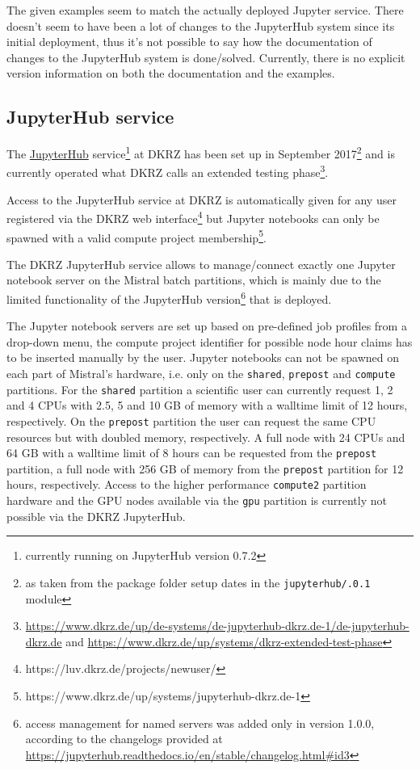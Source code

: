 The given examples seem to match the actually deployed Jupyter service.
There doesn't seem to have been a lot of changes to the JupyterHub system since its initial deployment, thus it's not possible to say how the documentation of changes to the JupyterHub system is done/solved.
Currently, there is no explicit version information on both the documentation and the examples.

\subsection{JupyterHub service}

The \href{https://jupyterhub.dkrz.de/}{JupyterHub} service\footnote{currently running on JupyterHub version 0.7.2} at DKRZ has been set up in September 2017\footnote{as taken from the package folder setup dates in the {\tt jupyterhub/.0.1} module} and is currently operated what DKRZ calls an extended testing phase\footnote{\url{https://www.dkrz.de/up/de-systems/de-jupyterhub-dkrz.de-1/de-jupyterhub-dkrz.de} and \url{https://www.dkrz.de/up/systems/dkrz-extended-test-phase}}.

Access to the JupyterHub service at DKRZ is automatically given for any user registered via the DKRZ web interface\footnote{https://luv.dkrz.de/projects/newuser/} but Jupyter notebooks can only be spawned with a valid compute project membership\footnote{https://www.dkrz.de/up/systems/jupyterhub-dkrz.de-1}.

The DKRZ JupyterHub service allows to manage/connect exactly one Jupyter notebook server on the Mistral batch partitions, which is mainly due to the limited functionality of the JupyterHub version\footnote{access management for named servers was added only in version 1.0.0, according to the changelogs provided at \url{https://jupyterhub.readthedocs.io/en/stable/changelog.html\#id3}} that is deployed.

The Jupyter notebook servers are set up based on pre-defined job profiles from a drop-down menu, the compute project identifier for possible node hour claims has to be inserted manually by the user.
Jupyter notebooks can not be spawned on each part of Mistral's hardware, i.e. only on the \verb|shared|, \verb|prepost| and \verb|compute| partitions.
For the \verb|shared| partition a scientific user can currently request 1, 2 and 4 CPUs with 2.5, 5 and 10 GB of memory with a walltime limit of 12 hours, respectively.
On the \verb|prepost| partition the user can request the same CPU resources but with doubled memory, respectively.
A full node with 24 CPUs and 64 GB with a walltime limit of 8 hours can be requested from the \verb|prepost| partition, a full node with 256 GB of memory from the \verb|prepost| partition for 12 hours, respectively.
Access to the higher performance \verb|compute2| partition hardware and the GPU nodes available via the \verb|gpu| partition is currently not possible via the DKRZ JupyterHub.

